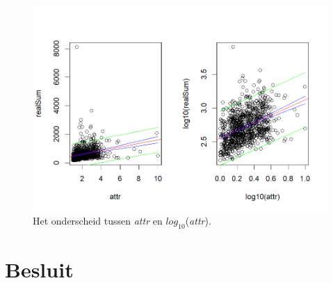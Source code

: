\documentclass[a4paper]{kulakarticle}
\begin{document}
\begin{figure}
	\centering
	\includegraphics[width=0.7\linewidth]{Figuren/betr.attr}
	\caption{Het onderscheid tussen \textit{attr} en $log_{10}$(\textit{attr}).}
	\label{fig:betr}
\end{figure}


	
	
	
	\section*{Besluit}
	
	
\end{document}
